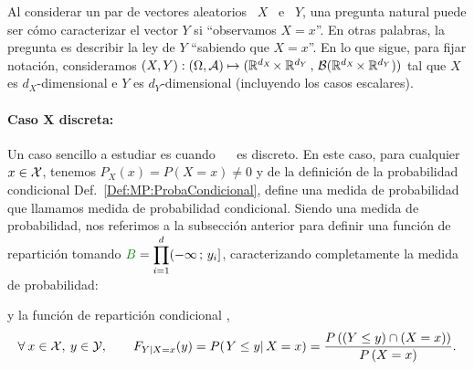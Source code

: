 \label{Sec:MP:LeyesCondicionales}

Al  considerar un  par de  vectores aleatorios  \ $X$  \ e  \ $Y$,  una pregunta
natural puede ser  c\'omo caracterizar el vector $Y$ si  ``observamos $X = x$''.
En otras palabras,  la pregunta es describir la ley  de $Y$ ``sabiendo   que  $X  =  x$''.   En  lo que  sigue,  para  fijar  notaci\'on,
consideramos $(X,Y): (  \Omega , \mathcal{A}) \mapsto (\mathbb{R}^{d_X}  \! \times \mathbb{R}^{d_Y}
\,   ,  \,  \mathcal{B}(\mathbb{R}^{d_X}   \!   \times   \mathbb{R}^{d_Y})  )$   tal  que   $X$  es
$d_X$-dimensional   e   $Y$   es   $d_Y$-dimensional   (incluyendo   los   casos
escalares).  



\paragraph{Caso $\boldsymbol{X}$ discreta:}
Un caso  sencillo a estudiar  es cuando \  \modif{$\X$} \ es discreto.   En este
caso, para  cualquier $x  \in \mathcal{X}$, tenemos  $P_X(x) = P(X  = x)  \ne 0$ y  de la
definici\'on de  la probabilidad condicional Def.~\ref{Def:MP:ProbaCondicional},
 define  una medida de
probabilidad que llamamos medida de probabilidad condicional.
%
Siendo una medida de probabilidad, nos referimos a la subsecci\'on anterior para
definir  una  funci\'on  de  repartici\'on tomando  $\displaystyle  \modif{B}  =
\prod_{i=1}^d  (-\infty  \; y_i]$,  caracterizando  completamente  la medida  de
probabilidad:
%
\begin{definicion}
\label{Def:MP:ReparticionCondicionalDiscreta}
%
  y la funci\'on de repartici\'on condicional ,
  \[
  \forall \:  x \in  \mathcal{X}, \: y  \in \mathcal{Y}, \qquad  F_{Y|X=x}(y) =  P( \left. Y  \le y
  \right| X = x ) = \frac{P\left(  \left(Y \le y \right) \cap \left(X = x\right)
    \right)}{P\left(X = x\right)}.
  \]
\end{definicion}

